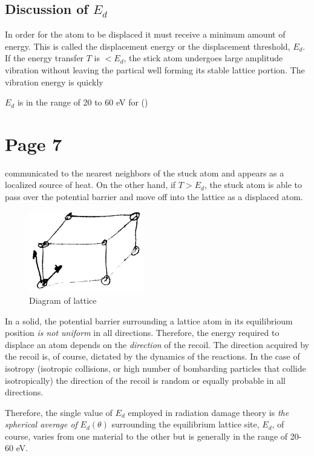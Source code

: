 \documentclass[11pt]{article}
\begin{document}
\subsection{Discussion of \texorpdfstring{$E_d$}{}}
In order for the atom to be displaced it must receive a minimum amount of energy. This is called the displacement energy or the displacement threshold, $E_d$. If the energy transfer $T$ is $<E_d$, the stick atom undergoes large amplitude vibration without leaving the partical well forming its stable lattice portion. The vibration energy is quickly

$E_d$ is in the range of 20 to 60 eV for ()

\section{Page 7}
communicated to the nearest neighbors of the stuck atom and appears as a localized source of heat. On the other hand, if $T>E_d$, the stuck atom is able to pass over the potential barrier and move off into the lattice as a displaced atom.

\begin{figure}
  \begin{center}
  \includegraphics[width=0.45\textwidth]{figs/fig2.png}
  \end{center}
  \caption{Diagram of lattice}
\end{figure}

In a solid, the potential barrier surrounding a lattice atom in its equilibrioum position \textit{is not uniform} in all directions. Therefore, the energy required to displace an atom depends on the \textit{direction} of the recoil. The direction acquired by the recoil is, of course, dictated by the dynamics of the reactions. In the case of isotropy (isotropic collisions, or high number of bombarding particles that collide isotropically) the direction of the recoil is random or equally probable in all directions.

Therefore, the single value of $E_d$ employed in radiation damage theory is \textit{the spherical average of} $E_d(\theta)$ surrounding the equilibrium lattice site, $E_d$, of course, varies from one material to the other but is generally in the range of 20-60 eV.
\end{document}
